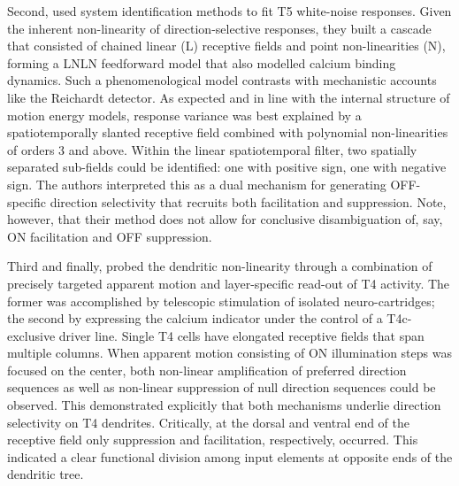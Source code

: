 Second, \citet{Leong:2016hu} used system identification methods to fit T5 white-noise responses. Given the inherent non-linearity of direction-selective responses, they built a cascade that consisted of chained linear (L) receptive fields and point non-linearities (N), forming a LNLN feedforward model that also modelled calcium binding dynamics. Such a phenomenological model contrasts with mechanistic accounts like the Reichardt detector. As expected and in line with the internal structure of motion energy models, response variance was best explained by a spatiotemporally slanted receptive field combined with polynomial non-linearities of orders 3 and above. Within the linear spatiotemporal filter, two spatially separated sub-fields could be identified: one with positive sign, one with negative sign. The authors interpreted this as a dual mechanism for generating OFF-specific direction selectivity that recruits both facilitation and suppression. Note, however, that their method does not allow for conclusive disambiguation of, say, ON facilitation and OFF suppression.

Third and finally, \citet{Haag:2016cq} probed the dendritic non-linearity through a combination of precisely targeted apparent motion and layer-specific read-out of T4 activity. The former was accomplished by telescopic stimulation of isolated neuro-cartridges; the second by expressing the calcium indicator under the control of a T4c-exclusive driver line. Single T4 cells have elongated receptive fields that span multiple columns. When apparent motion consisting of ON illumination steps was focused on the center, both non-linear amplification of preferred direction sequences as well as non-linear suppression of null direction sequences could be observed. This demonstrated explicitly that both mechanisms underlie direction selectivity on T4 dendrites. Critically, at the dorsal and ventral end of the receptive field only suppression and facilitation, respectively, occurred. This indicated a clear functional division among input elements at opposite ends of the dendritic tree.

